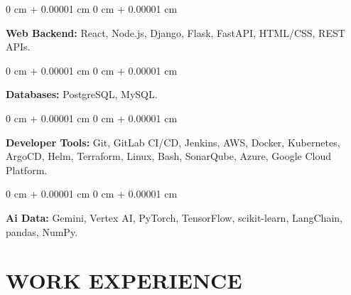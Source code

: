 \documentclass[9pt, letterpaper]{article}
\newenvironment{onecolentry}{
    \begin{adjustwidth}{
        0 cm + 0.00001 cm}{
        0 cm + 0.00001 cm}
}{
    \end{adjustwidth}
} %
\begin{document}
    \begin{onecolentry}
    \textbf{Web Backend:} React, Node.js, Django, Flask, FastAPI, HTML/CSS, REST APIs.
    \end{onecolentry}

    \begin{onecolentry}
    \textbf{Databases:} PostgreSQL, MySQL.
    \end{onecolentry}

    \begin{onecolentry}
    \textbf{Developer Tools:} Git, GitLab CI/CD, Jenkins, AWS, Docker, Kubernetes, ArgoCD, Helm, Terraform, Linux, Bash, SonarQube, Azure, Google Cloud Platform.
    \end{onecolentry}

    \begin{onecolentry}
    \textbf{Ai Data:} Gemini, Vertex AI, PyTorch, TensorFlow, scikit-learn, LangChain, pandas, NumPy.
    \end{onecolentry}


\section{WORK EXPERIENCE}
\end{document}

